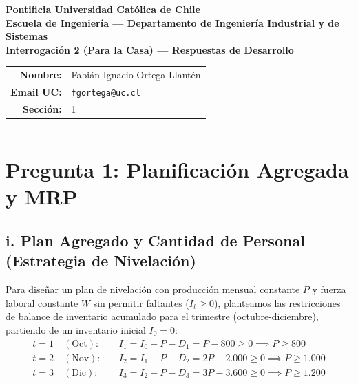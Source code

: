 \documentclass[11pt, a4paper]{article}
\begin{document}
\begin{center}
  \textbf{\Large Pontificia Universidad Católica de Chile} \\
  \textbf{Escuela de Ingeniería --- Departamento de Ingeniería Industrial y de Sistemas} \\
  \vspace{0.4cm}
  {\Large\bfseries Interrogación 2 (Para la Casa) --- Respuestas de Desarrollo} \\
  \vspace{0.3cm}
  \begin{tabular}{rl}
    \textbf{Nombre:} & Fabián Ignacio Ortega Llantén \\
    \textbf{Email UC:} & \texttt{fgortega@uc.cl} \\
    \textbf{Sección:} & 1
  \end{tabular}
\end{center}

\vspace{0.3cm}
\rule{\textwidth}{0.4pt}
\vspace{0.5cm}

\section*{Pregunta 1: Planificación Agregada y MRP}

\subsection*{i. Plan Agregado y Cantidad de Personal (Estrategia de Nivelación)}

Para diseñar un plan de nivelación con producción mensual constante $P$ y fuerza laboral constante $W$ sin permitir faltantes ($I_t \ge 0$), planteamos las restricciones de balance de inventario acumulado para el trimestre (octubre-diciembre), partiendo de un inventario inicial $I_0 = 0$:
\begin{align*}
  t = 1 \quad (\text{Oct}): \quad & I_1 = I_0 + P - D_1 = P - 800 \ge 0 \implies P \ge 800 \\
  t = 2 \quad (\text{Nov}): \quad & I_2 = I_1 + P - D_2 = 2P - 2.000 \ge 0 \implies P \ge 1.000 \\
  t = 3 \quad (\text{Dic}): \quad & I_3 = I_2 + P - D_3 = 3P - 3.600 \ge 0 \implies P \ge 1.200
\end{align*}
\end{document}
